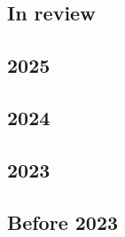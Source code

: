 
\subsection*{In review}
\renewcommand*{\bibfont}{\small} %
\begin{refsection}
  \nocite{*}
  {%
    \setlength\bibitemsep{0pt} %
    \printbibliography[heading=none]
  }%
\end{refsection}

\subsection*{2025}

\renewcommand*{\bibfont}{\small} %
\begin{refsection}
  \nocite{*}
  {%
    \setlength\bibitemsep{0pt} %
    \printbibliography[heading=none]
  }%
\end{refsection}


\subsection*{2024}

\renewcommand*{\bibfont}{\small} %
\begin{refsection}
  \nocite{*}
  {%
    \setlength\bibitemsep{0pt} %
    \printbibliography[heading=none]
  }%
\end{refsection}

\subsection*{2023}

\renewcommand*{\bibfont}{\small} %
\begin{refsection}
  \nocite{*}
  {%
    \setlength\bibitemsep{0pt} %
    \printbibliography[heading=none]
  }%
\end{refsection}

\subsection*{Before 2023}

\renewcommand*{\bibfont}{\small} %
\begin{refsection}
  \nocite{*}
  {%
    \setlength\bibitemsep{0pt} %
    \printbibliography[heading=none]
  }%
\end{refsection}